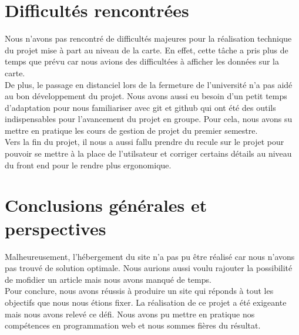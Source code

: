 \documentclass[12pt,a4paper]{report}
\begin{document}
\section{Difficultés rencontrées}
Nous n'avons pas rencontré de difficultés majeures pour la réalisation technique du projet mise à part au niveau de la carte. En effet, cette tâche a pris plus de temps que prévu car nous avions des difficultées à afficher les données sur la carte. \\

De plus, le passage en distanciel lors de la fermeture de l'université n'a pas aidé au bon développement du projet. Nous avons aussi eu besoin d'un petit temps d'adaptation pour nous familiariser avec git et github qui ont été des outils indispensables pour l'avancement du projet en groupe. Pour cela, nous avons su mettre en pratique les cours de gestion de projet du premier semestre. \\

Vers la fin du projet, il nous a aussi fallu prendre du recule sur le projet pour pouvoir se mettre à la place de l'utilsateur et corriger certains détails au niveau du front end pour le rendre plus ergonomique. 

\section{Conclusions générales et perspectives}
Malheureusement, l'hébergement du site n'a pas pu être réalisé car nous n'avons pas trouvé de solution optimale. Nous aurions aussi voulu rajouter la possibilité de mofidier un article mais nous avons manqué de temps. \\

Pour conclure, nous avons réussis à produire un site qui réponds à tout les objectifs que nous nous étions fixer. La réalisation de ce projet a été exigeante mais nous avons relevé ce défi. Nous avons pu mettre en pratique nos compétences en programmation web et nous sommes fières du résultat. 
\end{document}
